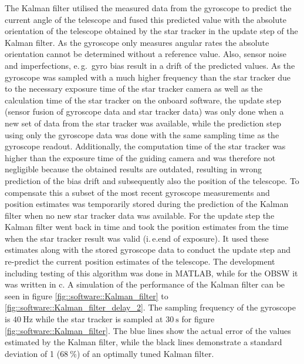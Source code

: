 The Kalman filter utilised the measured data from the gyroscope to predict the current angle of the telescope and fused this predicted value with the absolute orientation of the telescope obtained by the star tracker in the update step of the Kalman filter. As the gyroscope only measures angular rates the absolute orientation cannot be determined without a reference value. Also, sensor noise and imperfections, e.\,g.~gyro bias result in a drift of the predicted values. As the gyroscope was sampled with a much higher frequency than the star tracker due to the necessary exposure time of the star tracker camera as well as the calculation time of the star tracker on the onboard software, the update step (sensor fusion of gyroscope data and star tracker data) was only done when a new set of data from the star tracker was available, while the prediction step using only the gyroscope data was done with the same sampling time as the gyroscope readout. 
Additionally, the computation time of the star tracker was higher than the exposure time of the guiding camera and was therefore not negligible because the obtained results are outdated, resulting in wrong prediction of the bias drift and subsequently also the position of the telescope. To compensate this a subset of the most recent gyroscope measurements and position estimates was temporarily stored during the prediction of the Kalman filter when no new star tracker data was available. For the update step the Kalman filter went back in time and took the position estimates from the time when the star tracker result was valid (i.\,e.end of exposure). It used these estimates along with the stored gyroscope data to conduct the update step and re-predict the current position estimates of the telescope.
 The development including testing of this algorithm was done in MATLAB, while for the OBSW it was written in c. A simulation of the performance of the Kalman filter can be seen in figure \mbox{\ref{fig::software::Kalman_filter}} to \mbox{\ref{fig::software::Kalman_filter_delay_2}}. 
The sampling frequency of the gyroscope is $\SI{40}{\Hz}$ while the star tracker is sampled at $\SI{30}{\second}$ for figure \mbox{\ref{fig::software::Kalman_filter}}. The blue lines show the actual error of the values estimated by the Kalman filter, while the black lines demonstrate a standard deviation of 1 ($\SI{68}{\percent}$) of an optimally tuned Kalman filter. 
